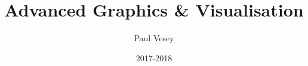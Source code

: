 


%
 {
}





\usepackage{eurosym}
\usepackage{graphicx}
\usepackage{wasysym}
\usepackage{listings}
\usepackage{pxfonts}
\usepackage{verbatim}
\usepackage{color}
\usepackage{xcolor}
\usepackage{wrapfig}
\usepackage{hyperref}
\usepackage[nomain, xindy, toc, acronym]{glossaries}







%

%
%






%
\title[Advanced Graphics \& Visualisation]{Advanced Graphics \& Visualisation}
%
\author{Paul Vesey}
\date{2017-2018}


